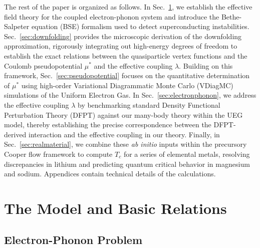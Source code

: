 \documentclass[%
 reprint,
superscriptaddress,
 amsmath,amssymb,
 aps,
prx,
]{revtex4-2}
\begin{document}
The rest of the paper is organized as follows. In Sec.~\ref{sec:model}, we establish the effective field theory for the coupled electron-phonon system and introduce the Bethe-Salpeter equation (BSE) formalism used to detect superconducting instabilities. Sec.~\ref{sec:downfolding} provides the microscopic derivation of the downfolding approximation, rigorously integrating out high-energy degrees of freedom to establish the exact relations between the quasiparticle vertex functions and the Coulomb pseudopotential $\mu^*$ and the effective coupling $\lambda$. Building on this framework, Sec.~\ref{sec:pseudopotential} focuses on the quantitative determination of $\mu^*$ using high-order Variational Diagrammatic Monte Carlo (VDiagMC) simulations of the Uniform Electron Gas. In Sec.~\ref{sec:electronphonon}, we address the effective coupling $\lambda$ by benchmarking standard Density Functional Perturbation Theory (DFPT) against our many-body theory within the UEG model, thereby establishing the precise correspondence between the DFPT-derived interaction and the effective coupling in our theory. Finally, in Sec.~\ref{sec:realmaterial}, we combine these \textit{ab initio} inputs within the precursory Cooper flow framework to compute $T_{c}$ for a series of elemental metals, resolving discrepancies in lithium and predicting quantum critical behavior in magnesium and sodium. 
Appendices contain technical details of the calculations.


\section{The Model and Basic Relations}
\label{sec:model}
\subsection{Electron-Phonon Problem}  
\end{document}
